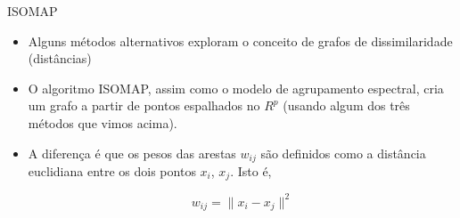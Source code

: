\documentclass[11pt]{beamer}
\begin{document}
\begin{frame}{ISOMAP}

\begin{itemize}

\item Alguns métodos alternativos exploram o conceito de grafos de dissimilaridade (distâncias)

\vspace{1cm}

\item O algoritmo ISOMAP, assim como o modelo de agrupamento espectral, cria um grafo a partir de pontos espalhados no $R^p$ (usando algum dos três métodos que vimos acima). 

\item A diferença é que os pesos das arestas $w_{ij}$ são definidos como a distância euclidiana entre os dois pontos $x_i$, $x_j$. Isto é,

$$w_{ij} = \parallel x_i - x_j\parallel^2$$

\end{itemize}

\vspace{.5cm}

\end{frame}
\end{document}
